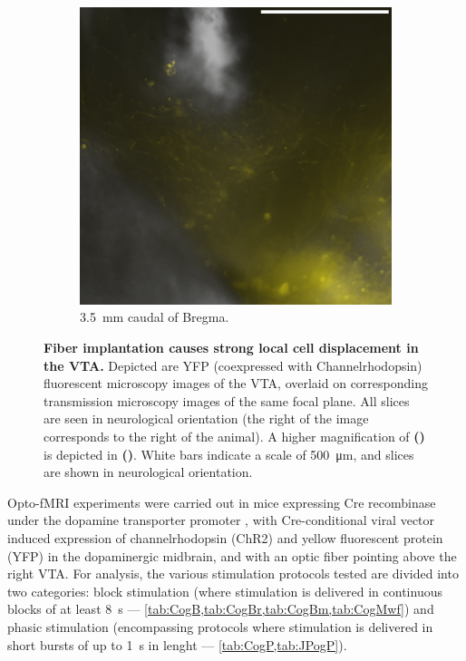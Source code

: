 \begin{figure}[h!]
\begin{subfigure}{.43\textwidth}
		\label{fig:h6589}
	\end{subfigure}
	\begin{subfigure}{.2728\textwidth}
		\centering
		\includegraphics[width=\textwidth]{img/sub-6589_slice-a4_zoom-10_scene-2_transmission-yfp-comb_straight.png}
                \caption{\SI{3.5}{\milli\meter} caudal of Bregma.}
		\label{fig:h6589z}
	\end{subfigure}
        \vspace{-.5em}
	\caption{
		\textbf{Fiber implantation causes strong local cell displacement in the VTA.}
                Depicted are YFP (coexpressed with Channelrhodopsin) fluorescent microscopy images of the VTA, overlaid on corresponding transmission microscopy images of the same focal plane.
                All slices are seen in neurological orientation (the right of the image corresponds to the right of the animal).
                A higher magnification of \textbf{()} is depicted in \textbf{()}.
                White bars indicate a scale of \SI{500}{\micro\meter}, and slices are shown in neurological orientation.
                }
	\label{fig:h}
\end{figure}

Opto-fMRI experiments were carried out in mice expressing Cre recombinase under the dopamine transporter promoter \cite{dat}, with Cre-conditional viral vector induced expression of channelrhodopsin (ChR2) and yellow fluorescent protein (YFP) in the dopaminergic midbrain, and with an optic fiber pointing above the right VTA.
For analysis, the various stimulation protocols tested are divided into two categories:
block stimulation (where stimulation is delivered in continuous blocks of at least \SI{8}{\second} --- \cref{tab:CogB,tab:CogBr,tab:CogBm,tab:CogMwf})
and
phasic stimulation (encompassing protocols where stimulation is delivered in short bursts of up to \SI{1}{\second} in lenght --- \cref{tab:CogP,tab:JPogP}).


